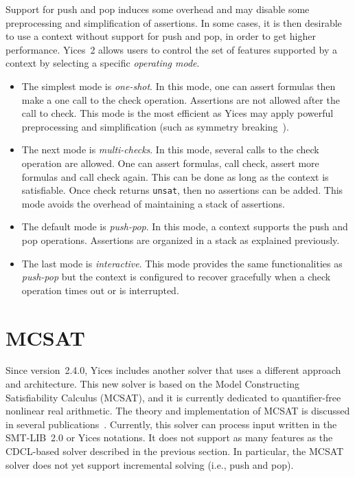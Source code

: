 \documentclass[11pt,twoside,fleqn,openright,titlepage]{cslreport}
\begin{document}
Support for  push and pop induces  some overhead and  may disable some
preprocessing and  simplification of assertions. In some  cases, it is
then desirable to  use a context without support for  push and pop, in
order to get  higher performance. Yices~2 allows users  to control the
set of  features supported by a  context by selecting  a specific {\em
  operating mode\/}.
\begin{itemize}
\item The simplest mode is {\em one-shot\/}. In this mode, one can
  assert formulas then make a one call to the check operation.
  Assertions are not allowed after the call to check. This mode is the
  most efficient as Yices may apply powerful preprocessing and
  simplification (such as symmetry breaking~\cite{Deharbe+etal:2011}).
\item The next mode is {\em multi-checks\/}. In this mode, several calls
  to the check operation are allowed. One can assert formulas, call
  check, assert more formulas and call check again. This can be done
  as long as the context is satisfiable. Once check returns
  \texttt{unsat}, then no assertions can be added. This mode avoids
  the overhead of maintaining a stack of assertions.
\item The default mode is {\em push-pop\/}. In this mode, a context
  supports the push and pop operations. Assertions are organized in a
  stack as explained previously.
\item The last mode is {\em interactive\/}. This mode provides the
  same functionalities as {\em push-pop\/} but the context is
  configured to recover gracefully when a check operation times out or
  is interrupted.
\end{itemize}


\section{MCSAT}
\label{mcsat}

Since version~2.4.0, Yices includes another solver that uses a
different approach and architecture. This new solver is based on the
Model Constructing Satisfiability Calculus (MCSAT), and it is
currently dedicated to quantifier-free nonlinear real arithmetic. The
theory and implementation of MCSAT is discussed in several
publications~\cite{Jovanovic-etal:MCSATb:2013,deMouraJovanovic:MCSAT:2013}.
Currently, this solver can process input written in the SMT-LIB~2.0 or
Yices notations. It does not support as many features as the
CDCL-based solver described in the previous section. In particular,
the MCSAT solver does not yet support incremental solving (i.e., push
and pop).
\end{document}
